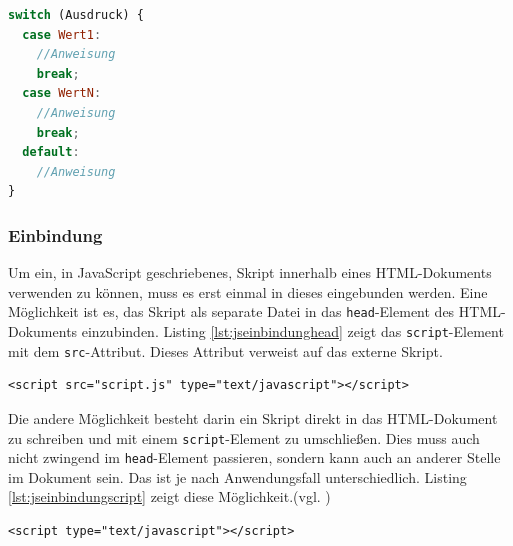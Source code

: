 \vspace{1em}
\begin{lstlisting}[language=JavaScript, caption=Syntax Switch-Anweisung, label=lst:jssyntaxswitch]
switch (Ausdruck) {
  case Wert1:
    //Anweisung
    break;
  case WertN:
    //Anweisung
    break;
  default:
    //Anweisung
}
\end{lstlisting}

\subsubsection{Einbindung} Um ein, in JavaScript geschriebenes, Skript innerhalb eines HTML-Dokuments verwenden zu können, muss es erst einmal in dieses eingebunden werden. Eine Möglichkeit ist es, das Skript als separate Datei in das \texttt{head}-Element des HTML-Dokuments einzubinden. Listing \ref{lst:jseinbindunghead} zeigt das \texttt{script}-Element mit dem \texttt{src}-Attribut. Dieses Attribut verweist auf das externe Skript.

\vspace{1em}
\begin{lstlisting}[language=HTML5, caption=JavaScript Einbindung als separate Datei im \texttt{head}-Element, label=lst:jseinbindunghead]
<script src="script.js" type="text/javascript"></script>
\end{lstlisting}

Die andere Möglichkeit besteht darin ein Skript direkt in das HTML-Dokument zu schreiben und mit einem \texttt{script}-Element zu umschließen. Dies muss auch nicht zwingend im \texttt{head}-Element passieren, sondern kann auch an anderer Stelle im Dokument sein. Das ist je nach Anwendungsfall unterschiedlich. Listing \ref{lst:jseinbindungscript} zeigt diese Möglichkeit.(vgl. \cite[S.]{})

\vspace{1em}
\begin{lstlisting}[language=HTML5, caption=JavaScript Einbindung in \texttt{script}-Element, label=lst:jseinbindungscript]
<script type="text/javascript"></script>
\end{lstlisting}

